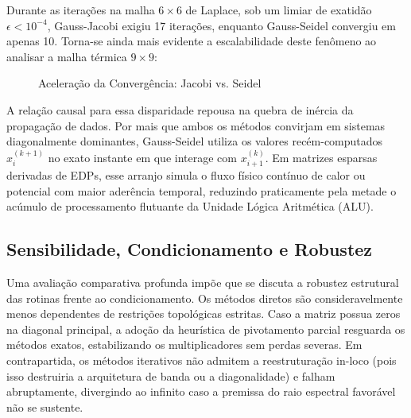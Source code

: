 Durante as iterações na malha $6 \times 6$ de Laplace, sob um limiar de exatidão $\epsilon < 10^{-4}$, Gauss-Jacobi exigiu 17 iterações, enquanto Gauss-Seidel convergiu em apenas 10. Torna-se ainda mais evidente a escalabilidade deste fenômeno ao analisar a malha térmica $9 \times 9$:

\begin{figure}[H]
\centering
{}
\caption{Aceleração da Convergência: Jacobi vs. Seidel}
\label{fig:comparacao_aceleracao}
\end{figure}

A relação causal para essa disparidade repousa na quebra de inércia da propagação de dados. Por mais que ambos os métodos convirjam em sistemas diagonalmente dominantes, Gauss-Seidel utiliza os valores recém-computados $x_i^{(k+1)}$ no exato instante em que interage com $x_{i+1}^{(k)}$. Em matrizes esparsas derivadas de EDPs, esse arranjo simula o fluxo físico contínuo de calor ou potencial com maior aderência temporal, reduzindo praticamente pela metade o acúmulo de processamento flutuante da Unidade Lógica Aritmética (ALU).

\subsection{Sensibilidade, Condicionamento e Robustez}

Uma avaliação comparativa profunda impõe que se discuta a robustez estrutural das rotinas frente ao condicionamento. Os métodos diretos são consideravelmente menos dependentes de restrições topológicas estritas. Caso a matriz possua zeros na diagonal principal, a adoção da heurística de pivotamento parcial resguarda os métodos exatos, estabilizando os multiplicadores sem perdas severas. Em contrapartida, os métodos iterativos não admitem a reestruturação in-loco (pois isso destruiria a arquitetura de banda ou a diagonalidade) e falham abruptamente, divergindo ao infinito caso a premissa do raio espectral favorável não se sustente.


